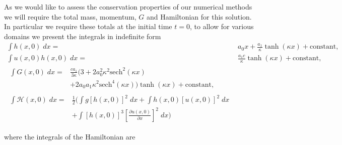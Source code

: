 As we would like to assess the conservation properties of our numerical methods we will require the total mass, momentum, $G$ and Hamiltonian for this solution. In particular we require these totals at the initial time $t=0$, to allow for various domains we present the integrals in indefinite form 
\begin{subequations}
	\begin{align}
	\int h(x,0) \; dx = {} & a_0 x + \frac{a_1}{\kappa} \tanh\left(\kappa x\right) + \text{constant}, \\
	\int u(x,0)h(x,0) \;  dx = {} & \frac{a_1 c}{\kappa} \tanh\left(\kappa x\right)+ \text{constant}, \\
	\begin{split}
	\int G(x,0) \; dx = {}&  \frac{c a_1}{3 \kappa}  \Bigg(3 + 2a_0^2 \kappa^2\text{sech}^2\left(\kappa x\right)  \\ &+ 2a_0 a_1 \kappa^2 \text{sech}^4\left(\kappa x\right) \Bigg)\tanh\left(\kappa x\right)  + \text{constant} ,
	\end{split}
	\\
	\begin{split}
	\int \mathcal{H}(x,0) \; dx = {}&\frac{1}{2} \Bigg(\int g\left[h(x,0)\right]^2 \; dx + \int h(x,0)\left[u(x,0)\right]^2 \; dx  \\ &+ \int \left[h(x,0)\right]^3 \left[\frac{\partial u(x,0)}{\partial x}\right]^2 \; dx \Bigg) 
	\end{split}
	\end{align}
	\label{eqn:SolitonConservation}
\end{subequations}

where the integrals of the Hamiltonian are

